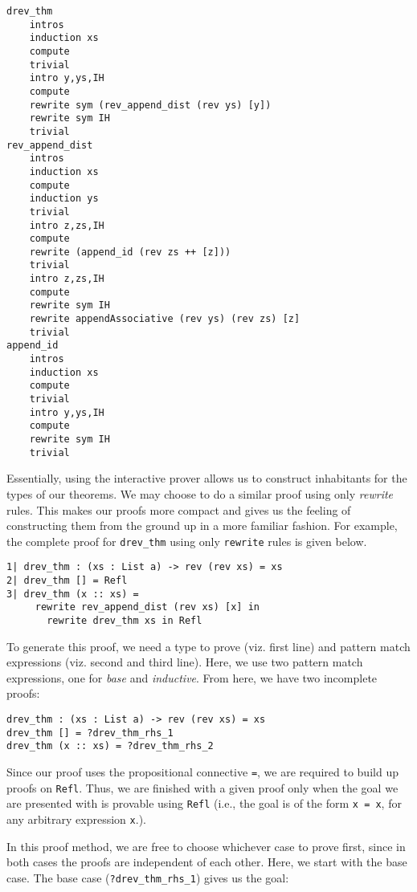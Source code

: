 \documentclass[9pt,preprint,nocopyrightspace,computermodern]{sigplanconf} %
\begin{document}
{\small
\begin{verbatim}
drev_thm
    intros
    induction xs
    compute
    trivial
    intro y,ys,IH
    compute
    rewrite sym (rev_append_dist (rev ys) [y])
    rewrite sym IH
    trivial
rev_append_dist
    intros
    induction xs
    compute
    induction ys
    trivial
    intro z,zs,IH
    compute
    rewrite (append_id (rev zs ++ [z]))
    trivial
    intro z,zs,IH
    compute
    rewrite sym IH
    rewrite appendAssociative (rev ys) (rev zs) [z]
    trivial
append_id
    intros
    induction xs
    compute
    trivial
    intro y,ys,IH
    compute
    rewrite sym IH
    trivial
\end{verbatim}
}

Essentially, using the interactive prover allows us to construct inhabitants
for the types of our theorems. We may choose to do a similar proof using
only \textit{rewrite} rules. This makes our proofs more compact and gives
us the feeling of constructing them from the ground up in a more familiar
fashion. For example, the complete proof for {\small\tt drev\_thm} using
only {\small\tt rewrite} rules is given below.

{\small
\begin{verbatim}
1| drev_thm : (xs : List a) -> rev (rev xs) = xs
2| drev_thm [] = Refl
3| drev_thm (x :: xs) = 
     rewrite rev_append_dist (rev xs) [x] in
       rewrite drev_thm xs in Refl
\end{verbatim}
}

To generate this proof, we need a type to prove (viz. first line) and
pattern match expressions (viz. second and third line). Here, we use
two pattern match expressions, one for \textit{base} and \textit{inductive}.
From here, we have two incomplete proofs:

{\small
\begin{verbatim}
drev_thm : (xs : List a) -> rev (rev xs) = xs
drev_thm [] = ?drev_thm_rhs_1
drev_thm (x :: xs) = ?drev_thm_rhs_2
\end{verbatim}
}

Since our proof uses the propositional connective {\small\tt =}, we are
required to build up proofs on {\small\tt Refl}. Thus, we are finished
with a given proof only when the goal we are presented with is provable using
{\small\tt Refl} (i.e., the goal is of the form {\small\tt x = x}, for any
arbitrary expression {\small\tt x}.).

In this proof method, we are free to choose whichever case to prove first, since
in both cases the proofs are independent of each other. Here, we start with the
base case. The base case ({\small\tt ?drev\_thm\_rhs\_1}) gives us the goal:
\end{document}
